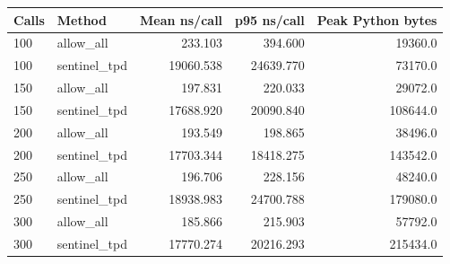 \begin{tabular}{llrrr}
Calls & Method & Mean ns/call & p95 ns/call & Peak Python bytes \\
\hline
100 & allow\_all & 233.103 & 394.600 & 19360.0 \\
100 & sentinel\_tpd & 19060.538 & 24639.770 & 73170.0 \\
150 & allow\_all & 197.831 & 220.033 & 29072.0 \\
150 & sentinel\_tpd & 17688.920 & 20090.840 & 108644.0 \\
200 & allow\_all & 193.549 & 198.865 & 38496.0 \\
200 & sentinel\_tpd & 17703.344 & 18418.275 & 143542.0 \\
250 & allow\_all & 196.706 & 228.156 & 48240.0 \\
250 & sentinel\_tpd & 18938.983 & 24700.788 & 179080.0 \\
300 & allow\_all & 185.866 & 215.903 & 57792.0 \\
300 & sentinel\_tpd & 17770.274 & 20216.293 & 215434.0 \\
\end{tabular}
